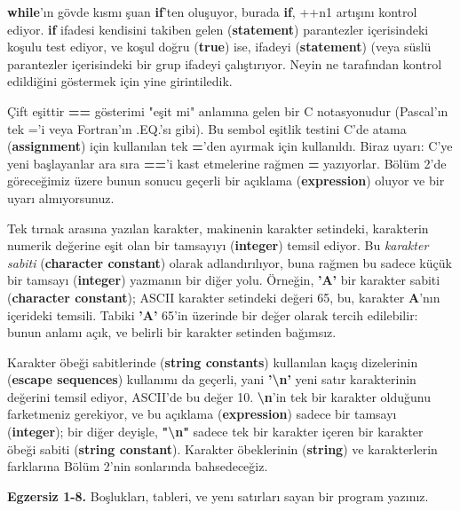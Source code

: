 \documentclass[a4paper,12pt,oneside]{book}
\begin{document}
\textbf{while}'ın gövde kısmı şuan \textbf{if}'ten oluşuyor, burada \textbf{if}, ++n1 artışını kontrol ediyor. \textbf{if} ifadesi kendisini takiben gelen (\textbf{statement}) parantezler içerisindeki koşulu test ediyor, ve koşul doğru (\textbf{true}) ise, ifadeyi (\textbf{statement}) (veya süslü parantezler içerisindeki bir grup ifadeyi çalıştırıyor. Neyin ne tarafından kontrol edildiğini göstermek için yine girintiledik.
\par Çift eşittir \textbf{==} gösterimi "eşit mi" anlamına gelen bir C notasyonudur (Pascal'ın tek ='i veya Fortran'ın .EQ.'sı gibi). Bu sembol eşitlik testini C'de atama (\textbf{assignment}) için kullanılan tek \textbf{=}'den ayırmak için kullanıldı. Biraz uyarı: C'ye yeni başlayanlar ara sıra \hspace{1mm} \textbf{==}'i kast etmelerine rağmen \hspace{1mm} \textbf{=} yazıyorlar. Bölüm 2'de göreceğimiz üzere bunun sonucu geçerli bir açıklama (\textbf{expression}) oluyor ve bir uyarı almıyorsunuz.
\par Tek tırnak arasına yazılan karakter, makinenin karakter setindeki, karakterin numerik değerine eşit olan bir tamsayıyı (\textbf{integer}) temsil ediyor. Bu \textit{karakter sabiti} (\textbf{character constant}) olarak adlandırılıyor, buna rağmen bu sadece küçük bir tamsayı (\textbf{integer}) yazmanın bir diğer yolu. Örneğin, \textbf{'A'} bir karakter sabiti (\textbf{character constant}); ASCII karakter setindeki değeri 65, bu, karakter \textbf{A}'nın içerideki temsili. Tabiki \textbf{'A'} 65'in üzerinde bir değer olarak tercih edilebilir: bunun anlamı açık, ve belirli bir karakter setinden bağımsız.
\par Karakter öbeği sabitlerinde (\textbf{string constants}) kullanılan kaçış dizelerinin (\textbf{escape sequences}) kullanımı da geçerli, yani \textbf{'\textbackslash n'} yeni satır karakterinin değerini temsil ediyor, ASCII'de bu değer 10. \textbf{\textbackslash n}'in tek bir karakter olduğunu farketmeniz gerekiyor, ve bu açıklama (\textbf{expression}) sadece bir tamsayı (\textbf{integer}); bir diğer deyişle, \textbf{"\textbackslash n"} sadece tek bir karakter içeren bir karakter öbeği sabiti (\textbf{string constant}). Karakter öbeklerinin (\textbf{string}) ve karakterlerin farklarına Bölüm 2'nin sonlarında bahsedeceğiz. \newline

\noindent \textbf{Egzersiz 1-8.} Boşlukları, tableri, ve yenı satırları sayan bir program yazınız. \newline
\end{document}
